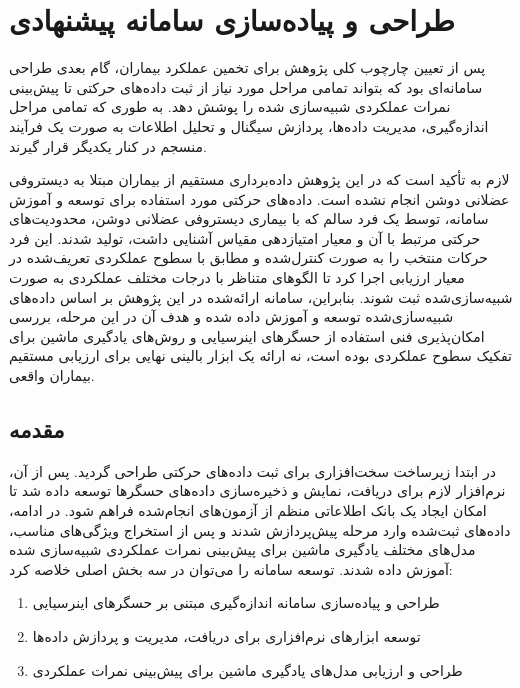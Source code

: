 \section{طراحی و پیاده‌سازی سامانه پیشنهادی}

پس از تعیین چارچوب کلی پژوهش برای تخمین عملکرد بیماران، گام بعدی طراحی سامانه‌ای بود که بتواند تمامی مراحل مورد نیاز از ثبت داده‌های حرکتی تا پیش‌بینی نمرات عملکردی شبیه‌سازی شده را پوشش دهد. به طوری که تمامی مراحل اندازه‌گیری، مدیریت داده‌ها، پردازش سیگنال و تحلیل اطلاعات به صورت یک فرآیند منسجم در کنار یکدیگر قرار گیرند. 

لازم به تأکید است که در این پژوهش داده‌برداری مستقیم از بیماران مبتلا به دیستروفی عضلانی دوشن انجام نشده است. داده‌های حرکتی مورد استفاده برای توسعه و آموزش سامانه، توسط یک فرد سالم که با بیماری دیستروفی عضلانی دوشن، محدودیت‌های حرکتی مرتبط با آن و معیار امتیازدهی مقیاس
  آشنایی داشت، تولید شدند. این فرد حرکات منتخب را به صورت کنترل‌شده و مطابق با سطوح عملکردی تعریف‌شده در معیار ارزیابی اجرا کرد تا الگوهای متناظر با درجات مختلف عملکردی به صورت شبیه‌سازی‌شده ثبت شوند. بنابراین، سامانه ارائه‌شده در این پژوهش بر اساس داده‌های شبیه‌سازی‌شده توسعه و آموزش داده شده و هدف آن در این مرحله، بررسی امکان‌پذیری فنی استفاده از حسگرهای اینرسیایی و روش‌های یادگیری ماشین برای تفکیک سطوح عملکردی بوده است، نه ارائه یک ابزار بالینی نهایی برای ارزیابی مستقیم بیماران واقعی.

\subsection{مقدمه}

در ابتدا زیرساخت سخت‌افزاری برای ثبت داده‌های حرکتی طراحی گردید. پس از آن، نرم‌افزار لازم برای دریافت، نمایش و ذخیره‌سازی داده‌های حسگرها توسعه داده شد تا امکان ایجاد یک بانک اطلاعاتی منظم از آزمون‌های انجام‌شده فراهم شود. در ادامه، داده‌های ثبت‌شده وارد مرحله پیش‌پردازش شدند و پس از استخراج ویژگی‌های مناسب، مدل‌های مختلف یادگیری ماشین برای پیش‌بینی نمرات عملکردی شبیه‌سازی شده آموزش داده شدند. توسعه سامانه را می‌توان در سه بخش اصلی خلاصه کرد:

\begin{enumerate}
	\item طراحی و پیاده‌سازی سامانه اندازه‌گیری مبتنی بر حسگرهای اینرسیایی
	\item توسعه ابزارهای نرم‌افزاری برای دریافت، مدیریت و پردازش داده‌ها
	\item طراحی و ارزیابی مدل‌های یادگیری ماشین برای پیش‌بینی نمرات عملکردی
\end{enumerate}

